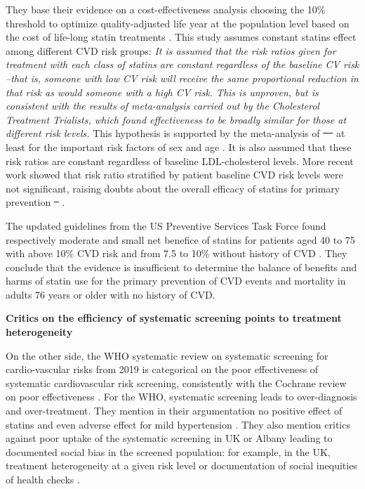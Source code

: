 \documentclass[10pt,letterpaper]{article}
\providecommand{\DIFaddtex}[1]{{\protect\color{blue}\uwave{#1}}} %
\providecommand{\DIFdeltex}[1]{{\protect\color{red}\sout{#1}}}                      %
\providecommand{\DIFaddbegin}{} %
\providecommand{\DIFaddend}{} %
\providecommand{\DIFdelbegin}{} %
\providecommand{\DIFdelend}{} %
\providecommand{\DIFadd}[1]{\texorpdfstring{\DIFaddtex{#1}}{#1}} %
\providecommand{\DIFdel}[1]{\texorpdfstring{\DIFdeltex{#1}}{}} %
\newcommand{\DIFscaledelfig}{0.5}
\newlength{\DIFdelgraphicswidth} %
\newlength{\DIFdelgraphicsheight} %
\newcommand{\DIFaddincludegraphics}[2][]{{\color{blue}\fbox{\DIFOincludegraphics[#1]{#2}}}} %
\newcommand{\DIFdelincludegraphics}[2][]{%
\sbox{\DIFdelgraphicsbox}{\DIFOincludegraphics[#1]{#2}}%
\settoboxwidth{\DIFdelgraphicswidth}{\DIFdelgraphicsbox} %
\settoboxtotalheight{\DIFdelgraphicsheight}{\DIFdelgraphicsbox} %
\scalebox{\DIFscaledelfig}{%
\parbox[b]{\DIFdelgraphicswidth}{\usebox{\DIFdelgraphicsbox}\\[-\baselineskip] \rule{\DIFdelgraphicswidth}{0em}}\llap{\resizebox{\DIFdelgraphicswidth}{\DIFdelgraphicsheight}{%
\setlength{\unitlength}{\DIFdelgraphicswidth}%
\begin{picture}(1,1)%
\thicklines\linethickness{2pt} %
{\color[rgb]{1,0,0}\put(0,0){\framebox(1,1){}}}%
{\color[rgb]{1,0,0}\put(0,0){\line( 1,1){1}}}%
{\color[rgb]{1,0,0}\put(0,1){\line(1,-1){1}}}%
\end{picture}%
}\hspace*{3pt}}} %
} %
\DeclareRobustCommand{\DIFaddbegin}{\DIFOaddbegin \let\includegraphics\DIFaddincludegraphics} %
\DeclareRobustCommand{\DIFaddend}{\DIFOaddend \let\includegraphics\DIFOincludegraphics} %
\DeclareRobustCommand{\DIFdelbegin}{\DIFOdelbegin \let\includegraphics\DIFdelincludegraphics} %
\DeclareRobustCommand{\DIFdelend}{\DIFOaddend \let\includegraphics\DIFOincludegraphics} %
\begin{document}
They base their evidence on a cost-effectiveness analysis choosing the 10\%
threshold to optimize quality-adjusted life year at the population level based
on the cost of life-long statin treatments \cite{guthrie2023competing}. This
study assumes constant statins effect among different CVD risk groups:
\emph{It is assumed that the risk ratios given for treatment with each class
  of statins are constant regardless of the baseline CV risk --that is, someone
  with low CV risk will receive the same proportional reduction in that risk as
  would someone with a high CV risk. This is unproven, but is consistent with
  the results of meta-analysis carried out by the Cholesterol Treatment
  Trialists, which found effectiveness to be broadly similar for those at
  different risk levels.} This hypothesis is supported by the meta-analysis of
\DIFdelbegin \DIFdel{\mbox{%
    \cite{brugts2009benefits} }\hspace{0pt}%
}\DIFdelend at least for the important risk factors of sex and age \DIFaddbegin \DIFadd{\mbox{%
    \cite{brugts2009benefits}}\hspace{0pt}%
}\DIFaddend . It is also assumed that these risk ratios are constant regardless of
baseline LDL-cholesterol levels. More recent work showed that risk ratio
stratified by patient baseline CVD risk levels were not significant, raising
doubts about the overall efficacy of statins for primary prevention \DIFdelbegin \DIFdel{\mbox{%
    \cite[Table 1]{byrne2019statins}}\hspace{0pt}%
}\DIFdelend \DIFaddbegin \DIFadd{\mbox{%
    \cite{byrne2019statins}}\hspace{0pt}%
}\DIFaddend .

The updated guidelines from the US Preventive Services Task Force found
respectively moderate and small net benefice of statins for patients aged 40
to 75 with above 10\% CVD risk and from 7.5 to 10\% without history of CVD
\cite{chou2022statin}. They conclude that the evidence is insufficient to
determine the balance of benefits and harms of statin use for the primary
prevention of CVD events and mortality in adults 76 years or older with no
history of CVD.


\textbf{Critics on the efficiency of systematic screening points to treatment heterogeneity}

On the other side, the WHO systematic review on systematic screening for
cardio-vascular risks from 2019 \cite{eriksen2021effectiveness} is
categorical on the poor effectiveness of systematic cardiovascular risk
screening, consistently with the Cochrane review on poor effectiveness
\cite{krogsboll2012general}. For the WHO, systematic screening leads to
over-diagnosis and over-treatment. They mention in their argumentation no
positive effect of statins and even adverse effect for mild hypertension
\cite{diao2012pharmacotherapy}. They also mention critics against poor
uptake of the systematic screening in UK or Albany leading to documented
social bias in the screened population: for example, in the UK, treatment
heterogeneity at a given risk level \cite{van2013efficiency} or documentation
of social inequities of health checks \cite{krska2016implementation}.
\end{document}
